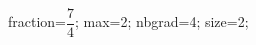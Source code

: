 \documentclass[exercice]{thedocument}%
\begin{document}
%
\>fraction=$\dfrac{7}{4}$;%
\>max=2;%
\>nbgrad=4;%
\>size=2;%
%
\end{document}
